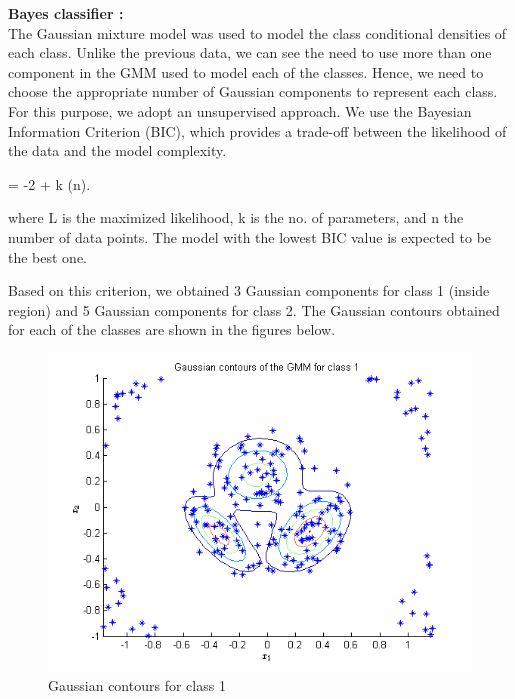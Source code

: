 \documentclass{article}
\begin{document}
\begin{flushleft}

\textbf{Bayes classifier :}  \\[10pt]
The Gaussian mixture model was used to model the class conditional densities of each class. Unlike the previous data, we can see the need to use more than one component in the GMM used to model each of the classes. Hence, we need to choose the appropriate number of Gaussian components to represent each class.
\\[10pt]

For this purpose, we adopt an unsupervised approach. We use the Bayesian Information Criterion (BIC), which provides a trade-off between the likelihood of the data and the model complexity.

  = {-2 \cdot {} + k \cdot \ln(n)}. \ 


where \hat L is the maximized likelihood, k is the no. of parameters, and n the number of data points. The model with the lowest BIC value is expected to be the best one.


Based on this criterion, we obtained 3 Gaussian components for class 1 (inside region) and 5 Gaussian components for class 2. The Gaussian contours obtained for each of the classes are shown in the figures below.



\end{flushleft}


\begin{figure}[H]
\centering
\includegraphics[width=\linewidth]{Classification/nonlinearlySeparable/gmm_1.png}
\caption{Gaussian contours for class 1}
\end{figure}
\end{document}
